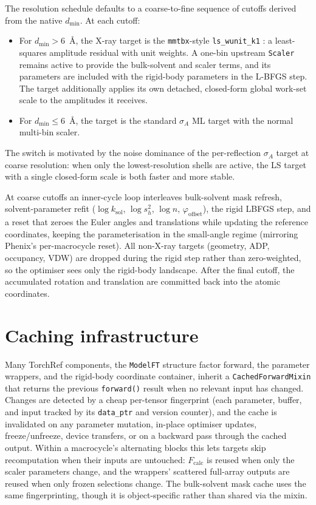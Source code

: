 \documentclass{iucrjournals}
\begin{document}
The resolution schedule defaults to a coarse-to-fine sequence of
cutoffs derived from the native $d_\mathrm{min}$.  At each cutoff:
%
\begin{itemize}
\item For $d_\mathrm{min} > 6$~\AA{}, the X-ray target is the
  \texttt{mmtbx}-style \texttt{ls\_wunit\_k1} \cite{afonine_towards_2012}: a
  least-squares amplitude residual with unit weights. A one-bin upstream
  \texttt{Scaler} remains active to provide the bulk-solvent and scaler terms,
  and its parameters are included with the rigid-body parameters in the L-BFGS
  step. The target additionally applies its own detached, closed-form global
  work-set scale to the amplitudes it receives.
\item For $d_\mathrm{min} \leq 6$~\AA{}, the target is the standard
  $\sigma_{A}$ ML target with the normal multi-bin scaler.
\end{itemize}
%
The switch is motivated by the noise dominance of the per-reflection
$\sigma_{A}$ target at coarse resolution: when only the lowest-resolution
shells are active, the LS target with a single closed-form scale is
both faster and more stable.

At coarse cutoffs an inner-cycle loop interleaves bulk-solvent mask
refresh, solvent-parameter refit ($\log k_\mathrm{sol}$, $\log s_{h}^{2}$, $\log n$,
$\varphi_\mathrm{offset}$), the rigid LBFGS step, and a reset that zeroes the
Euler angles and translations while updating the reference coordinates,
keeping the parameterisation in the small-angle regime (mirroring Phenix's
per-macrocycle reset).  All non-X-ray targets (geometry, ADP, occupancy,
VDW) are dropped during the rigid step rather than zero-weighted, so the
optimiser sees only the rigid-body landscape.  After the final cutoff,
the accumulated rotation and translation are committed back into the
atomic coordinates.


\section{Caching infrastructure}\label{sec:caching}

Many TorchRef components, the \texttt{ModelFT} structure factor forward, the
parameter wrappers, and the rigid-body coordinate container, inherit a
\texttt{CachedForwardMixin} that returns the previous \texttt{forward()}
result when no relevant input has changed.  Changes are detected by a cheap
per-tensor fingerprint (each parameter, buffer, and input tracked by its
\texttt{data\_ptr} and version counter), and the cache is invalidated on any
parameter mutation, in-place optimiser updates, freeze/unfreeze, device
transfers, or on a backward pass through the cached output.  Within a
macrocycle's alternating blocks this lets targets skip recomputation when
their inputs are untouched: $F_\mathrm{calc}$ is reused when only the scaler
parameters change, and the wrappers' scattered full-array outputs are reused
when only frozen selections change.  The bulk-solvent mask cache uses the same
fingerprinting, though it is object-specific rather than shared via the mixin. 



\end{document}
